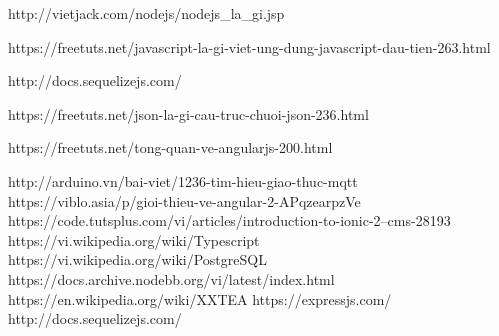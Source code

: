 \documentclass[a4paper,12pt,oneside]{article}
\begin{document}
\begin{thebibliography}{80}
 http://vietjack.com/nodejs/nodejs\_la\_gi.jsp

 https://freetuts.net/javascript-la-gi-viet-ung-dung-javascript-dau-tien-263.html

 http://docs.sequelizejs.com/

 https://freetuts.net/json-la-gi-cau-truc-chuoi-json-236.html

 https://freetuts.net/tong-quan-ve-angularjs-200.html

 http://arduino.vn/bai-viet/1236-tim-hieu-giao-thuc-mqtt
 https://viblo.asia/p/gioi-thieu-ve-angular-2-APqzearpzVe 
 https://code.tutsplus.com/vi/articles/introduction-to-ionic-2--cms-28193 
 https://vi.wikipedia.org/wiki/Typescript 
 https://vi.wikipedia.org/wiki/PostgreSQL 
 https://docs.archive.nodebb.org/vi/latest/index.html 
 https://en.wikipedia.org/wiki/XXTEA
 https://expressjs.com/
 http://docs.sequelizejs.com/
\end{thebibliography}
\end{document}
